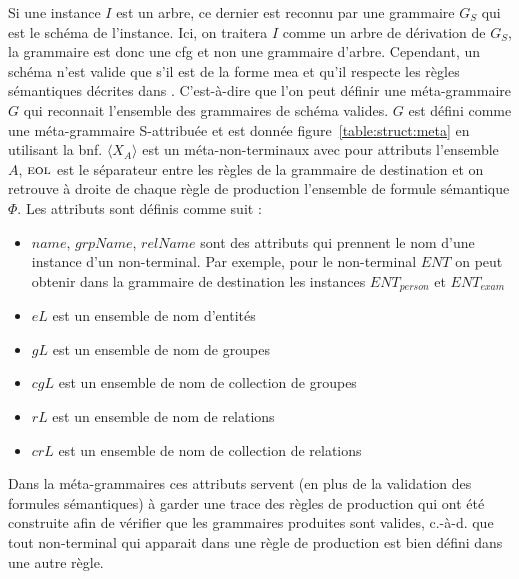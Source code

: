 \begin{definition}
    Si une instance $I$ est un arbre, ce dernier est reconnu par une grammaire $G_S$ qui est le schéma de l'instance.
    Ici, on traitera $I$ comme un arbre de dérivation de $G_S$, la grammaire est donc une \gls{cfg} et non une grammaire d'arbre.
    Cependant, un schéma n'est valide que s'il est de la forme \gls{mea} et qu'il respecte les règles sémantiques décrites dans \cite{barretGenericAbstractionsData2021}.
    C'est-à-dire que l'on peut définir une méta-grammaire $G$ qui reconnait l'ensemble des grammaires de schéma valides.
    $G$ est défini comme une méta-grammaire S-attribuée et est donnée figure~\ref{table:struct:meta} en utilisant la \gls{bnf}.
    $\langle X_A \rangle$ est un méta-non-terminaux avec pour attributs l'ensemble $A$, $\textsc{eol}$ est le séparateur entre les règles de la grammaire de destination et on retrouve à droite de chaque règle de production l'ensemble de formule sémantique $\Phi$.
    Les attributs sont définis comme suit :
    \begin{itemize}
        \item $name$, $grpName$, $relName$ sont des attributs qui prennent le nom d'une instance d'un non-terminal. Par exemple, pour le non-terminal $ENT$ on peut obtenir dans la grammaire de destination les instances $ENT_{person}$ et $ENT_{exam}$
        \item $eL$ est un ensemble de nom d'entités
        \item $gL$ est un ensemble de nom de groupes
        \item $cgL$ est un ensemble de nom de collection de groupes
        \item $rL$ est un ensemble de nom de relations
        \item $crL$ est un ensemble de nom de collection de relations
    \end{itemize}
    Dans la méta-grammaires ces attributs servent (en plus de la validation des formules sémantiques) à garder une trace des règles de production qui ont été construite afin de vérifier que les grammaires produites sont valides, c.-à-d. que tout non-terminal qui apparait dans une règle de production est bien défini dans une autre règle.
\end{definition}

